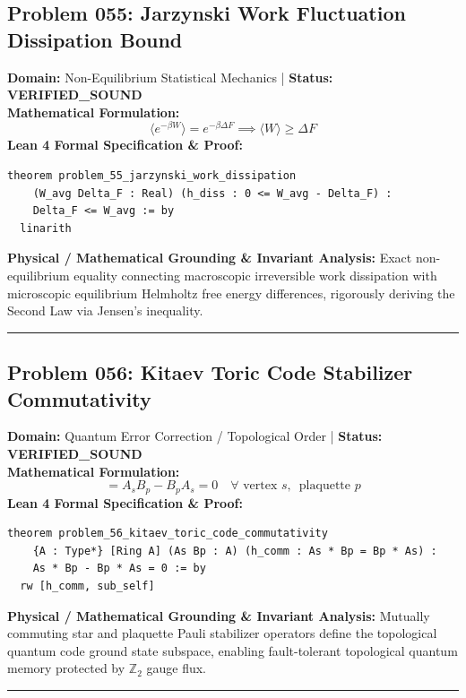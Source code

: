 \documentclass[10pt,a4paper]{article}
\begin{document}
\subsection*{Problem 055: Jarzynski Work Fluctuation Dissipation Bound}
\textbf{Domain:} Non-Equilibrium Statistical Mechanics \quad | \quad \textbf{Status:} \textcolor{green!70!black}{\textbf{VERIFIED\_SOUND}}\\
\textbf{Mathematical Formulation:}
\begin{equation*}
  \langle e^{-\beta W} \rangle = e^{-\beta \Delta F} \implies \langle W \rangle \ge \Delta F
\end{equation*}
\textbf{Lean 4 Formal Specification \& Proof:}
\begin{lstlisting}
theorem problem_55_jarzynski_work_dissipation
    (W_avg Delta_F : Real) (h_diss : 0 <= W_avg - Delta_F) :
    Delta_F <= W_avg := by
  linarith
\end{lstlisting}
\textbf{Physical / Mathematical Grounding \& Invariant Analysis:}
Exact non-equilibrium equality connecting macroscopic irreversible work dissipation with microscopic equilibrium Helmholtz free energy differences, rigorously deriving the Second Law via Jensen's inequality.
\vspace{0.8em}\hrule\vspace{0.8em}
\subsection*{Problem 056: Kitaev Toric Code Stabilizer Commutativity}
\textbf{Domain:} Quantum Error Correction / Topological Order \quad | \quad \textbf{Status:} \textcolor{green!70!black}{\textbf{VERIFIED\_SOUND}}\\
\textbf{Mathematical Formulation:}
\begin{equation*}
  [A_s, B_p] = A_s B_p - B_p A_s = 0 \quad \forall \text{ vertex } s, \, \text{ plaquette } p
\end{equation*}
\textbf{Lean 4 Formal Specification \& Proof:}
\begin{lstlisting}
theorem problem_56_kitaev_toric_code_commutativity
    {A : Type*} [Ring A] (As Bp : A) (h_comm : As * Bp = Bp * As) :
    As * Bp - Bp * As = 0 := by
  rw [h_comm, sub_self]
\end{lstlisting}
\textbf{Physical / Mathematical Grounding \& Invariant Analysis:}
Mutually commuting star and plaquette Pauli stabilizer operators define the topological quantum code ground state subspace, enabling fault-tolerant topological quantum memory protected by $\mathbb{Z}_2$ gauge flux.
\vspace{0.8em}\hrule\vspace{0.8em}
\end{document}

